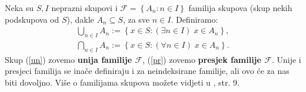 \begin{remark}
\label{unprfam}
Neka su \(S,I\) neprazni skupovi i \(\mathcal{F}=\left\{A_n : n\in I\right\}\) familija skupova (skup nekih podskupova od \(S\)), dakle \(A_n\subseteq S\), za sve \(n\in I\). Definiramo:
\begin{gather}
\label{un}
\bigcup_{n\in I}{A_n}:=\left\{x\in S : (\exists n\in I)\; x\in A_n\right\},\\
\label{pr}
\bigcap_{n\in I}{A_n}:=\left\{x\in S : (\forall n\in I)\; x\in A_n\right\}.
\end{gather}
Skup (\ref{un}) zovemo \textbf{unija familije \(\mathcal{F}\)}, (\ref{pr}) zovemo \textbf{presjek familije \(\mathcal{F}\)}. Unije i presjeci familija se inače definiraju i za neindeksirane familije, ali ovo će za nas biti dovoljno. Više o familijama skupova možete vidjeti u \cite{9}, str. 9.
\end{remark}

